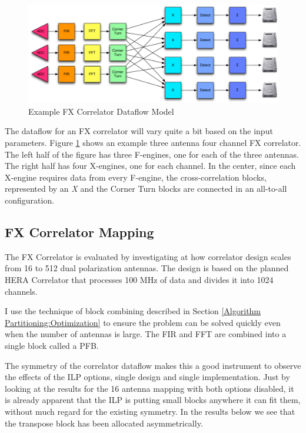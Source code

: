 \begin{figure}[h!]
  \centering
    \includegraphics[width=1\textwidth]{Images/C4/fx_dataflow.pdf}
  \caption{Example FX Correlator Dataflow Model}
  \label{fig: C6/fx_dataflow.pdf}
\end{figure}

The dataflow for an FX correlator will vary quite a bit based on the input parameters. 
Figure \ref{fig: C6/fx_dataflow.pdf} shows an example three antenna four channel FX correlator. 
The left half of the figure has three F-engines, one for each of the three antennas.
The right half has four X-engines, one for each channel.
In the center, since each X-engine requires data from every F-engine, the cross-correlation blocks, represented by an \emph{X} and the Corner Turn blocks are connected in an all-to-all configuration.

\subsection{FX Correlator Mapping}
The FX Correlator is evaluated by investigating at how correlator design scales from 16 to 512 dual polarization antennas.
The design is based on the planned HERA Correlator that processes 100 MHz of data and divides it into 1024 channels.

I use the technique of block combining described in Section \ref{Algorithm Partitioning:Optimization} to ensure the problem can be solved quickly even when the number of antennas is large.
The FIR and FFT are combined into a single block called a PFB.

The symmetry of the correlator dataflow makes this a good instrument to observe the effects of the ILP options, single design and single implementation.
Just by looking at the results for the 16 antenna mapping with both options disabled, it is already apparent that the ILP is putting small blocks anywhere it can fit them, without much regard for the existing symmetry.
In the results below we see that the transpose block has been allocated asymmetrically.

